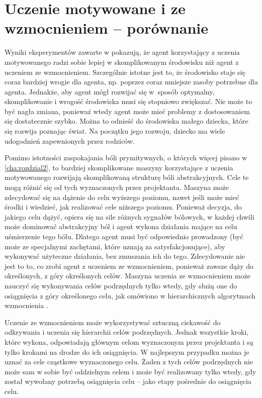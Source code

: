\chapter{Uczenie motywowane i ze wzmocnieniem -- porównanie}
\label{cha:rozdzial4}

Wyniki eksperymentów zawarte w \cite{ml_comp_int} pokazują, że agent 
korzystający z uczenia motywowanego radzi sobie lepiej w skomplikowanym 
środowisku niż agent z uczeniem ze wzmocnieniem. Szczególnie istotne jest to, 
że środowisko staje się coraz bardziej wrogie dla agenta, np. poprzez coraz 
mniejsze zasoby potrzebne dla agenta. Jednakże, aby agent mógł rozwijać się 
w~sposób optymalny, skomplikowanie i wrogość środowiska musi się stopniowo 
zwiększać. Nie może to być nagła zmiana, ponieważ wtedy agent może mieć 
problemy z dostosowaniem się dostatecznie szybko. Można to odnieść do 
środowiska małego dziecka, które się rozwija poznając świat. Na początku jego 
rozwoju, dziecko ma wiele udogodnień zapewnionych przez rodziców.

Pomimo istotności zaspokajania bóli prymitywnych, o których więcej pisano w 
\ref{cha:rozdzial2}, to bardziej skomplikowane maszyny korzystające z uczenia 
motywowanego rozwijają skomplikowaną strukturę bóli abstrakcyjnych. Cele te 
mogą różnić się od tych wyznaczonych przez projektanta. Maszyna może zdecydować 
się na dążenie do celu wyższego poziomu, nawet jeśli może mieć środki i 
wiedzieć, jak realizować cele niższego poziomu. Ponieważ decyzja, do jakiego 
celu dążyć, opiera się na sile różnych sygnałów bólowych, w każdej chwili może 
dominować abstrakcyjny ból i agent wykona działania mające na celu 
uśmierzenie tego bólu. Dlatego agent musi być odpowiednio prowadzony (być 
może ze specjalnymi zachętami, które uznają za satysfakcjonujące), aby 
wykonywać użyteczne działania, bez zmuszania ich do tego. Zdecydowanie nie jest 
to to, co zrobi agent z uczeniem ze wzmocnieniem, ponieważ zawsze dąży do 
określonych, z góry określonych celów. Maszyna uczenia ze wzmocnieniem może 
nauczyć się wykonywania celów podrzędnych tylko wtedy, gdy służą one do 
osiągnięcia z góry określonego celu, jak omówiono w hierarchicznych algorytmach 
wzmocnienia \cite{hrl_bakker}.

Uczenie ze wzmocnieniem może wykorzystywać sztuczną ciekawość do odkrywania i 
uczenia się hierarchii  celów podrzędnych. Jednak wszystkie kroki, które 
wykona, odpowiadają głównym celom wyznaczonym przez projektanta i są tylko 
krokami na drodze do ich osiągnięcia. W najlepszym przypadku można je uznać za 
cele cząstkowe wyznaczonego celu. Żaden z tych celów podrzędnych nie może sam w 
sobie być oddzielnym celem i może być realizowany tylko wtedy, gdy został 
wywołany potrzebą osiągnięcia celu -- jako etapy pośrednie do osiągnięcia celu.

